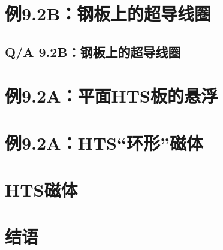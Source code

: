 \section*{例9.2B：钢板上的超导线圈}



\subsection{Q/A 9.2B：钢板上的超导线圈}



\section*{例9.2A：平面HTS板的悬浮}




\section*{例9.2A：HTS“环形”磁体}




\section{HTS磁体}



\section{结语}